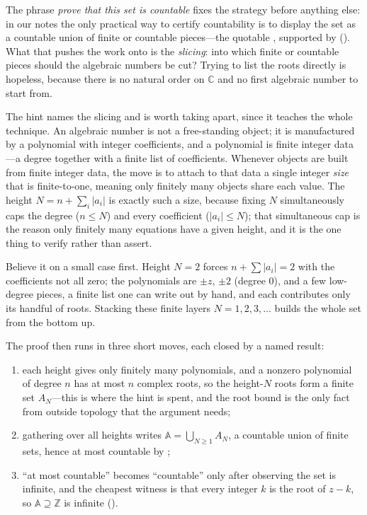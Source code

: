 \documentclass[main.tex]{subfiles}
\begin{document}
\begin{Reflection}
The phrase \emph{prove that this set is countable} fixes the strategy before anything else: in our
notes the only practical way to certify countability is to display the set as a countable union of
finite or countable pieces---the quotable , supported by  (). What that pushes the work onto is the \emph{slicing}: into which
finite or countable pieces should the algebraic numbers be cut? Trying to list the roots directly is
hopeless, because there is no natural order on $\mathbb{C}$ and no first algebraic number to start
from.

The hint names the slicing and is worth taking apart, since it teaches the whole technique. An
algebraic number is not a free-standing object; it is manufactured by a polynomial with integer
coefficients, and a polynomial is finite integer data---a degree together with a finite list of
coefficients. Whenever objects are built from finite integer data, the move is to attach to that data
a single integer \emph{size} that is finite-to-one, meaning only finitely many objects share each
value. The height $N=n+\sum_i|a_i|$ is exactly such a size, because fixing $N$ simultaneously caps the
degree ($n\le N$) and every coefficient ($|a_i|\le N$); that simultaneous cap is the reason only
finitely many equations have a given height, and it is the one thing to verify rather than assert.

Believe it on a small case first. Height $N=2$ forces $n+\sum|a_i|=2$ with the coefficients not all
zero; the polynomials are $\pm z$, $\pm 2$ (degree $0$), and a few low-degree pieces, a finite
list one can write out by hand, and each contributes only its handful of roots. Stacking these finite layers $N=1,2,3,\dots$
builds the whole set from the bottom up.

The proof then runs in three short moves, each closed by a named result:
\begin{enumerate}[leftmargin=1.7em,itemsep=3pt,topsep=2pt,label=\textnormal{(\arabic*)}]
  \item each height gives only finitely many polynomials, and a nonzero polynomial of degree $n$ has at
        most $n$ complex roots, so the height-$N$ roots form a finite set $A_N$---this is where the hint
        is spent, and the root bound is the only fact from outside topology that the argument needs;
  \item gathering over all heights writes $\mathbb{A}=\bigcup_{N\ge 1}A_N$, a countable union of finite
        sets, hence at most countable by ;
  \item ``at most countable'' becomes ``countable'' only after observing the set is infinite, and the
        cheapest witness is that every integer $k$ is the root of $z-k$, so $\mathbb{A}\supseteq\mathbb{Z}$
        is infinite ().
\end{enumerate}


\end{Reflection}
\end{document}
